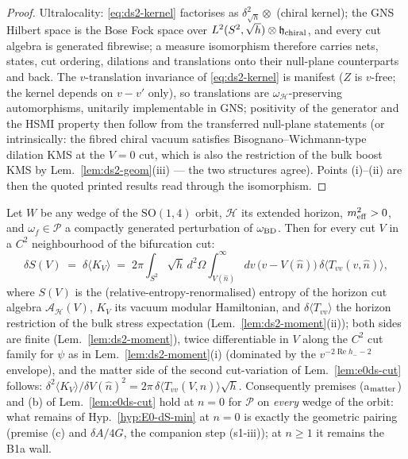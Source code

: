 \begin{proof}
Ultralocality: \eqref{eq:ds2-kernel} factorises as
$\delta^2_{\sqrt h}\otimes$ (chiral kernel); the GNS Hilbert space is
the Bose Fock space over $L^2(S^2,\sqrt h)\otimes\mathfrak h_{\rm
chiral}$, and every cut algebra is generated fibrewise; a measure
isomorphism therefore carries nets, states, cut ordering, dilations
and translations onto their null-plane counterparts and back. The
$v$-translation invariance of \eqref{eq:ds2-kernel} is manifest
($Z$ is $v$-free; the kernel depends on $v-v'$ only), so
translations are $\omega_{\mathcal H}$-preserving automorphisms,
unitarily implementable in GNS; positivity of the generator and the
HSMI property then follow from the transferred null-plane statements
(or intrinsically: the fibred chiral vacuum satisfies
Bisognano--Wichmann-type dilation KMS at the $V=0$ cut, which is
also the restriction of the bulk boost KMS
\cite{BorchersBuchholz1999} by Lem.~\ref{lem:ds2-geom}(iii) --- the
two structures agree). Points (i)--(ii) are then the quoted printed
results read through the isomorphism.
\end{proof}

\begin{theorem}[(s1-ii) discharged at $n=0$ for the compactly
  generated class]
\label{thm:ds2-composition}
Let $W$ be any wedge of the $\mathrm{SO}(1,4)$ orbit, $\mathcal H$
its extended horizon, $m^2_{\rm eff}>0$, and
$\omega_f\in\mathcal P$ a compactly generated perturbation of
$\omega_{\rm BD}$. Then for every cut $V$ in a $C^2$ neighbourhood
of the bifurcation cut:
\begin{equation}
\label{eq:ds2-firstlaw}
\delta S(V)\;=\;\delta\langle K_V\rangle\;=\;
2\pi\int_{S^2}\!\sqrt h\,d^2\Omega\int_{V(\hat
n)}^{\infty}\!dv\,\bigl(v-V(\hat n)\bigr)\,
\delta\langle T_{vv}(v,\hat n)\rangle ,
\end{equation}
where $S(V)$ is the (relative-entropy-renormalised) entropy of the
horizon cut algebra $\mathcal A_{\mathcal H}(V)$, $K_V$ its vacuum
modular Hamiltonian, and $\delta\langle T_{vv}\rangle$ the horizon
restriction of the bulk stress expectation
(Lem.~\ref{lem:ds2-moment}(ii)); both sides are finite
(Lem.~\ref{lem:ds2-moment}), twice differentiable in $V$ along the
$C^2$ cut family for $\psi$ as in Lem.~\ref{lem:ds2-moment}(i)
(dominated by the $v^{-2\operatorname{Re}h_--2}$ envelope), and the
matter side of the second cut-variation of Lem.~\ref{lem:e0ds-cut}
follows: $\delta^2\langle K_V\rangle/\delta V(\hat n)^2=2\pi\,
\delta\langle T_{vv}(V,\hat n)\rangle\sqrt h$. Consequently premises
(a$_{\rm matter}$) and (b) of Lem.~\ref{lem:e0ds-cut} hold at $n=0$
for $\mathcal P$ on \emph{every} wedge of the orbit: what remains of
Hyp.~\ref{hyp:E0-dS-min} at $n=0$ is exactly the geometric pairing
(premise (c) and $\delta A/4G$, the companion step (s1-iii)); at
$n\ge1$ it remains the B1a wall.
\end{theorem}

